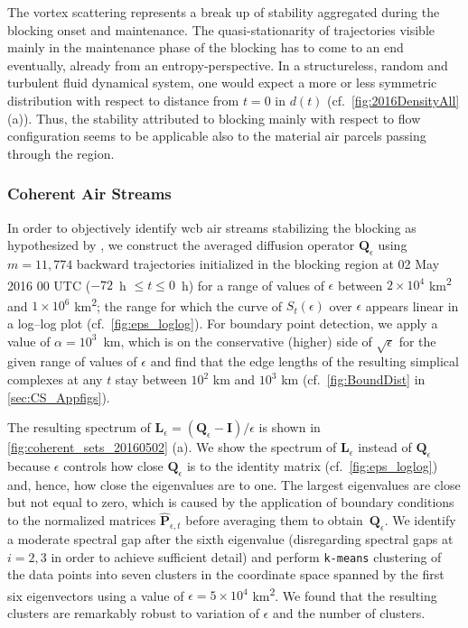 The vortex scattering represents a break up of stability aggregated during the blocking onset and maintenance. The quasi-stationarity of trajectories visible mainly in the maintenance phase of the blocking has to come to an end eventually, already from an entropy-perspective. In a structureless, random and turbulent fluid dynamical system, one would expect a more or less symmetric distribution with respect to distance from $t=0$ in $d(t)$ (cf.~\cref{fig:2016DensityAll} (a)). Thus, the stability attributed to blocking mainly with respect to flow configuration seems to be applicable also to the material air parcels passing through the region.

\subsubsection{Coherent Air Streams}

In order to objectively identify \gls{wcb} air streams stabilizing the blocking as hypothesized by \textcite{steinfeldRoleLatentHeating2019}, we construct the averaged diffusion operator $\mathbf{Q}_{\epsilon}$ using $m = 11,774$ backward trajectories initialized in the blocking region at 02 May 2016 00 UTC ($-72$~h $\leq t \leq 0$~h) for a range of values of $\epsilon$ between $2 \times 10^4$ km\textsuperscript{2} and $1 \times 10^6$ km\textsuperscript{2}; the range for which the curve of $S_{t}(\epsilon)$ over $\epsilon$ appears linear in a log--log plot (cf.~\cref{fig:eps_loglog}). For boundary point detection, we apply a value of $\alpha=10^3$~km, which is on the conservative (higher) side of $\sqrt{\epsilon}$ for the given range of values of $\epsilon$ and find that the edge lengths of the resulting simplical complexes at any $t$ stay between $10^2$ km and $10^3$ km (cf.~\cref{fig:BoundDist} in \cref{sec:CS_Appfigs}).

The resulting spectrum of $\mathbf{L}_{\epsilon} = (\mathbf{Q}_{\epsilon} - \mathbf{I})/\epsilon$ is shown in \cref{fig:coherent_sets_20160502} (a). We show the spectrum of $\mathbf{L}_{\epsilon}$ instead of $\mathbf{Q}_{\epsilon}$ because $\epsilon$ controls how close $\mathbf{Q}_{\epsilon}$ is to the identity matrix (cf.~\cref{fig:eps_loglog}) and, hence, how close the eigenvalues are to one. The largest eigenvalues are close but not equal to zero, which is caused by the application of boundary conditions to the normalized matrices $\hat{\mathbf{P}}_{\epsilon, t}$ before averaging them to obtain~$\mathbf{Q}_{\epsilon}$. We identify a  moderate spectral gap after the sixth eigenvalue (disregarding spectral gaps at $i=2, 3$ in order to achieve sufficient detail) and perform \texttt{k-means} clustering of the data points into seven clusters in the coordinate space spanned by the first six eigenvectors using a value of $\epsilon = 5\times 10^4$ km\textsuperscript{2}. We found that the resulting clusters are remarkably robust to variation of $\epsilon$ and the number of clusters.

